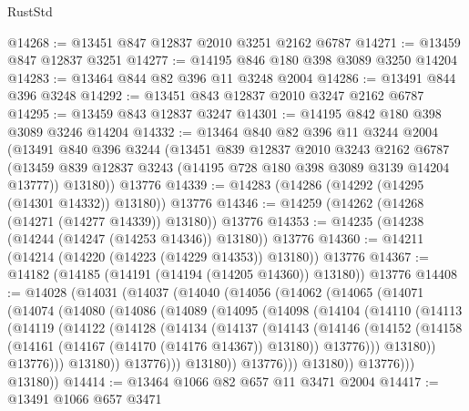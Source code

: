 \begin{lexlean}{RustStd}
\begin{coremodule}
{\begin{coremodule}
{{{{{{{{{{{{{{{{{{{{{{{{{{{{{{{@14268 := @13451 @847 @12837 @2010 @3251 @2162 @6787
@14271 := @13459 @847 @12837 @3251
@14277 := @14195 @846 @180 @398 @3089 @3250 @14204
@14283 := @13464 @844 @82 @396 @11 @3248 @2004
@14286 := @13491 @844 @396 @3248
@14292 := @13451 @843 @12837 @2010 @3247 @2162 @6787
@14295 := @13459 @843 @12837 @3247
@14301 := @14195 @842 @180 @398 @3089 @3246 @14204
@14332 := @13464
    @840
    @82
    @396
    @11
    @3244
    @2004
    (@13491
      @840
      @396
      @3244
      (@13451
        @839
        @12837
        @2010
        @3243
        @2162
        @6787
        (@13459 @839 @12837 @3243 (@14195 @728 @180 @398 @3089 @3139 @14204 @13777))
        @13180))
    @13776
@14339 := @14283 (@14286 (@14292 (@14295 (@14301 @14332)) @13180)) @13776
@14346 := @14259 (@14262 (@14268 (@14271 (@14277 @14339)) @13180)) @13776
@14353 := @14235 (@14238 (@14244 (@14247 (@14253 @14346)) @13180)) @13776
@14360 := @14211 (@14214 (@14220 (@14223 (@14229 @14353)) @13180)) @13776
@14367 := @14182 (@14185 (@14191 (@14194 (@14205 @14360)) @13180)) @13776
@14408 := @14028
    (@14031
      (@14037
        (@14040
          (@14056
            (@14062
              (@14065
                (@14071
                  (@14074
                    (@14080
                      (@14086
                        (@14089
                          (@14095
                            (@14098
                              (@14104
                                (@14110
                                  (@14113
                                    (@14119
                                      (@14122
                                        (@14128
                                          (@14134
                                            (@14137
                                              (@14143
                                                (@14146
                                                  (@14152
                                                    (@14158
                                                      (@14161
                                                        (@14167 (@14170 (@14176 @14367)) @13180))
                                                      @13776)))
                                                @13180))
                                            @13776)))
                                      @13180))
                                  @13776)))
                            @13180))
                        @13776)))
                  @13180))
              @13776)))
        @13180))
@14414 := @13464 @1066 @82 @657 @11 @3471 @2004
@14417 := @13491 @1066 @657 @3471
}}}}}}}}}}}}}}}}}}}}}}}}}}}}}}}
\end{coremodule}}
\end{coremodule}
\end{lexlean}
